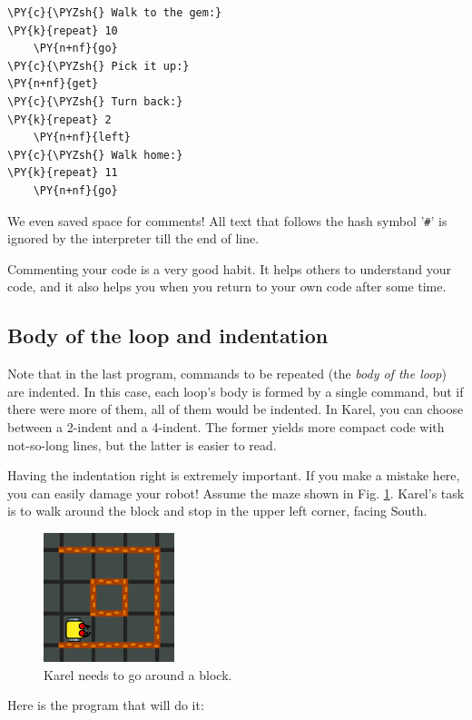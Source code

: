 \begin{bbox}
\begin{Verbatim}[commandchars=\\\{\}]
\PY{c}{\PYZsh{} Walk to the gem:}
\PY{k}{repeat} 10
    \PY{n+nf}{go}
\PY{c}{\PYZsh{} Pick it up:}
\PY{n+nf}{get}
\PY{c}{\PYZsh{} Turn back:}
\PY{k}{repeat} 2
    \PY{n+nf}{left}
\PY{c}{\PYZsh{} Walk home:}
\PY{k}{repeat} 11
    \PY{n+nf}{go}
\end{Verbatim}
\end{bbox}
\vspace{6mm}

\noindent
We even saved space for comments! All text that follows the hash symbol '{\tt \#}' 
is ignored by the interpreter till the end of line. \\

\begin{gbox}
\begin{center}
Commenting your code is a very good habit. It helps others to understand 
your code, and it also helps you when you return to your own code after some time.
\end{center}
\end{gbox}

\subsection{Body of the loop and indentation}

Note that in the last program, commands to be repeated (the {\em body of the loop}) 
are indented. In this case, each loop's body is formed by a single command, but if
there were more of them, all of them would be indented. In Karel, you can choose between 
a 2-indent and a 4-indent. The former yields more compact code with not-so-long lines, 
but the latter is easier to read. 

Having the indentation right is extremely important. If you make 
a mistake here, you can easily damage your robot! 
Assume the maze shown in Fig. \ref{fig:repeat-11}.
Karel's task is to walk around the block and stop in the 
upper left corner, facing South. 

\begin{figure}[!ht]
\begin{center}
\includegraphics[width=3.8cm]{img/repeat-11.png}
\vspace{-0mm}
\caption{Karel needs to go around a block.}
\label{fig:repeat-11}
\end{center}
\end{figure}
\noindent
Here is the program that will do it:\\

